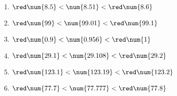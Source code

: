     \phantom{rrr}

    \begin{enumerate}
        \item ${\red\num{8.5  }} < \num{8.51  } < {\red \num{8.6  }}$
        \item ${\red\num{99   }} < \num{99.01 } < {\red \num{99.1 }}$
        \item ${\red\num{0.9  }} < \num{0.956 } < {\red \num{1    }}$
        \item ${\red\num{29.1 }} < \num{29.108} < {\red \num{29.2 }}$
        \item ${\red\num{123.1}} < \num{123.19} < {\red \num{123.2}}$
        \item ${\red\num{77.7 }} < \num{77.777} < {\red \num{77.8 }}$
    \end{enumerate}
